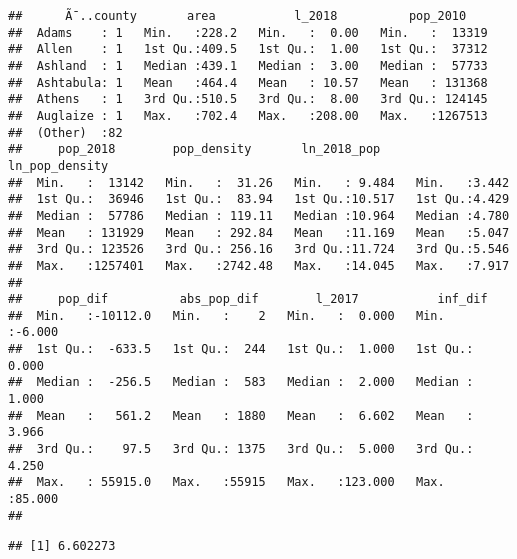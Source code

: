 \documentclass[]{article}
\newenvironment{Shaded}{\begin{snugshade}}{\end{snugshade}}
\newcommand{\DecValTok}[1]{\textcolor[rgb]{0.00,0.00,0.81}{#1}}
\newcommand{\KeywordTok}[1]{\textcolor[rgb]{0.13,0.29,0.53}{\textbf{#1}}}
\newcommand{\NormalTok}[1]{#1}
\newcommand{\OperatorTok}[1]{\textcolor[rgb]{0.81,0.36,0.00}{\textbf{#1}}}
\begin{document}
\begin{verbatim}
##      Ã¯..county       area           l_2018          pop_2010      
##  Adams    : 1   Min.   :228.2   Min.   :  0.00   Min.   :  13319  
##  Allen    : 1   1st Qu.:409.5   1st Qu.:  1.00   1st Qu.:  37312  
##  Ashland  : 1   Median :439.1   Median :  3.00   Median :  57733  
##  Ashtabula: 1   Mean   :464.4   Mean   : 10.57   Mean   : 131368  
##  Athens   : 1   3rd Qu.:510.5   3rd Qu.:  8.00   3rd Qu.: 124145  
##  Auglaize : 1   Max.   :702.4   Max.   :208.00   Max.   :1267513  
##  (Other)  :82                                                     
##     pop_2018        pop_density       ln_2018_pop     ln_pop_density 
##  Min.   :  13142   Min.   :  31.26   Min.   : 9.484   Min.   :3.442  
##  1st Qu.:  36946   1st Qu.:  83.94   1st Qu.:10.517   1st Qu.:4.429  
##  Median :  57786   Median : 119.11   Median :10.964   Median :4.780  
##  Mean   : 131929   Mean   : 292.84   Mean   :11.169   Mean   :5.047  
##  3rd Qu.: 123526   3rd Qu.: 256.16   3rd Qu.:11.724   3rd Qu.:5.546  
##  Max.   :1257401   Max.   :2742.48   Max.   :14.045   Max.   :7.917  
##                                                                      
##     pop_dif          abs_pop_dif        l_2017           inf_dif      
##  Min.   :-10112.0   Min.   :    2   Min.   :  0.000   Min.   :-6.000  
##  1st Qu.:  -633.5   1st Qu.:  244   1st Qu.:  1.000   1st Qu.: 0.000  
##  Median :  -256.5   Median :  583   Median :  2.000   Median : 1.000  
##  Mean   :   561.2   Mean   : 1880   Mean   :  6.602   Mean   : 3.966  
##  3rd Qu.:    97.5   3rd Qu.: 1375   3rd Qu.:  5.000   3rd Qu.: 4.250  
##  Max.   : 55915.0   Max.   :55915   Max.   :123.000   Max.   :85.000  
## 
\end{verbatim}

\begin{Shaded}
\end{Shaded}

\begin{verbatim}
## [1] 6.602273
\end{verbatim}

\begin{Shaded}
\end{Shaded}
\end{document}
